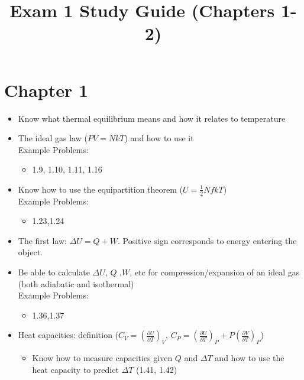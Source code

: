 \documentclass{article}
\title{Exam 1 Study Guide (Chapters 1-2)}
\date{}
\begin{document}
\maketitle

\section*{Chapter 1}
\begin{itemize}
	\item Know what thermal equilibrium means and how it relates to temperature
	\item The ideal gas law ($PV=NkT$) and how to use it \\
	Example Problems:
		\begin{itemize}
			\item 1.9, 1.10, 1.11, 1.16
		\end{itemize}
	\item Know how to use the equipartition theorem ($U=\frac{1}{2}NfkT$)\\
	Example Problems:
	\begin{itemize}
		\item 1.23,1.24
	\end{itemize}
	\item The first law: $\Delta U=Q+W$. Positive sign corresponds to energy entering the object.
	\item Be able to calculate $\Delta U$, $Q$ ,$W$, etc for compression/expansion of an ideal gas (both adiabatic and isothermal)\\
		Example Problems:
	\begin{itemize}
		\item 1.36,1.37
	\end{itemize}
	\item Heat capacities: definition ($C_V=\left(\frac{\partial U}{\partial T} \right)_V$, $C_P=\left(\frac{\partial U}{\partial T} \right)_P + P\left(\frac{\partial V}{\partial T}\right)_P$)
	\begin{itemize}
		\item Know how to measure capacities given $Q$ and $\Delta T$ and how to use the heat capacity to predict $\Delta T$ (1.41, 1.42)
	\end{itemize}
	
\end{itemize}
\end{document}
